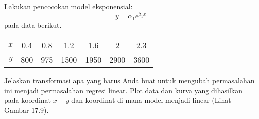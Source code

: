 \begin{soal}

Lakukan pencocokan model eksponensial:
\begin{equation*}
y = \alpha_{1} e^{\beta_{1}x}
\end{equation*}
pada data berikut.

{\centering
\begin{tabular}{|c|ccc ccc|}
\hline
$x$ & 0.4 & 0.8 & 1.2 & 1.6 & 2 & 2.3 \\
$y$ & 800 & 975 & 1500 & 1950 & 2900 & 3600 \\
\hline
\end{tabular}
\par}
Jelaskan transformasi apa yang harus Anda buat untuk mengubah permasalahan
ini menjadi permasalahan regresi linear.
Plot data dan kurva yang dihasilkan pada koordinat $x-y$ dan koordinat di mana
model menjadi linear (Lihat Gambar 17.9).
\end{soal}